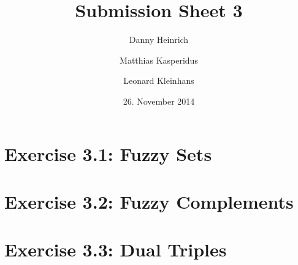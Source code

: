 \documentclass{scrartcl}
\title{Submission Sheet 3}
\author{Danny Heinrich \and Matthias Kasperidus \and Leonard Kleinhans}
\date{26. November 2014}
\begin{document}
\maketitle

\section{Exercise 3.1: Fuzzy Sets}

\section{Exercise 3.2: Fuzzy Complements}

\section{Exercise 3.3: Dual Triples}
\end{document}
